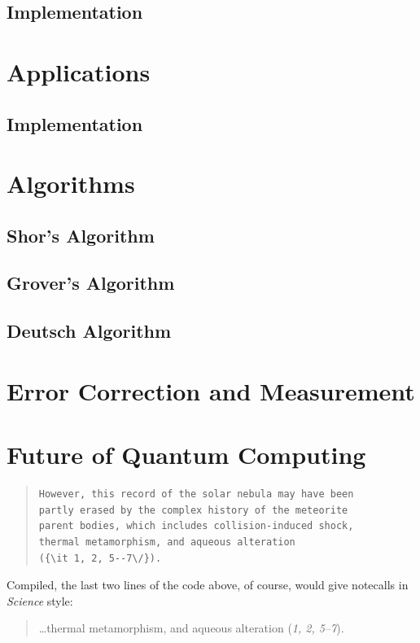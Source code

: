 \documentclass[12pt]{article}
\begin{document}
\subsection{Implementation}

\section{Applications}
\subsection{Implementation}
\section{Algorithms}
\subsection{Shor's Algorithm}
\subsection{Grover's Algorithm}
\subsection{Deutsch Algorithm}
\section{Error Correction and Measurement}
\section{Future of Quantum Computing}



\begin{quote}
\begin{verbatim}
However, this record of the solar nebula may have been
partly erased by the complex history of the meteorite
parent bodies, which includes collision-induced shock,
thermal metamorphism, and aqueous alteration
({\it 1, 2, 5--7\/}).
\end{verbatim}
\end{quote}


\noindent Compiled, the last two lines of the code above, of course, would give notecalls in {\it Science\/} style:

\begin{quote}
\ldots thermal metamorphism, and aqueous alteration ({\it 1, 2, 5--7\/}).
\end{quote}
\end{document}
